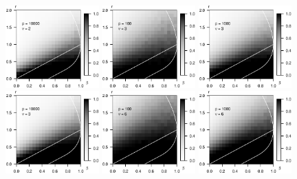 \begin{figure}
      \includegraphics[width=0.32\textwidth]{./sim_weak_boundary/simulated_weak_boundary_chi-squared_nu2_p10000.eps}
      \includegraphics[width=0.32\textwidth]{./sim_weak_boundary/simulated_weak_boundary_chi-squared_nu3_p100.eps}
      \includegraphics[width=0.32\textwidth]{./sim_weak_boundary/simulated_weak_boundary_chi-squared_nu3_p1000.eps}
      \includegraphics[width=0.32\textwidth]{./sim_weak_boundary/simulated_weak_boundary_chi-squared_nu3_p10000.eps}
      \includegraphics[width=0.32\textwidth]{./sim_weak_boundary/simulated_weak_boundary_chi-squared_nu6_p100.eps}
      \includegraphics[width=0.32\textwidth]{./sim_weak_boundary/simulated_weak_boundary_chi-squared_nu6_p1000.eps}

\end{figure}
